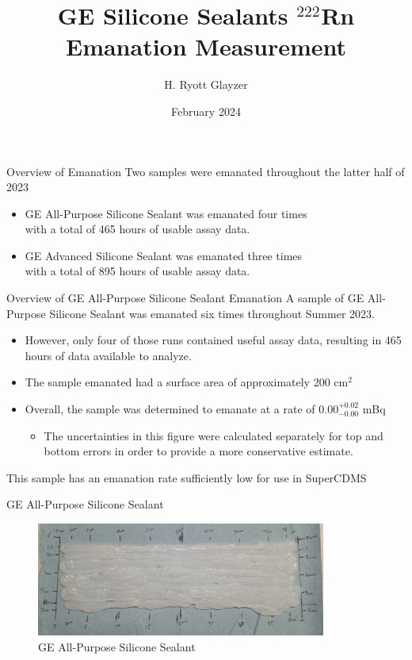\documentclass[aspectratio=169]{beamer}
\title{GE Silicone Sealants $^{222}$Rn Emanation Measurement}
\author[H. R. Glayzer]{H. Ryott Glayzer}
\institute[SDSMT]
{Lab Assistant\\
    SD Mines}
\date[2024]{February 2024}
\begin{document}
\frame{\titlepage}

\begin{frame}{Overview of Emanation}
    Two samples were emanated throughout the latter half of 2023
    \begin{itemize}
        \item GE All-Purpose Silicone Sealant was emanated four times\\
            with a total of 465 hours of usable assay data.
        \item GE Advanced Silicone Sealant was emanated three times\\
            with a total of 895 hours of usable assay data.
    \end{itemize}
\end{frame}

\begin{frame}{Overview of GE All-Purpose Silicone Sealant Emanation}
    A sample of GE All-Purpose Silicone Sealant was emanated six times throughout Summer 2023.
        \begin{itemize}
            \item However, only four of those runs contained useful assay data,\@
                resulting in 465 hours of data available to analyze.
            \item The sample emanated had a surface area of approximately 200 cm$^{2}$
            \item Overall, the sample was determined to emanate at a rate of 0.00$^{+0.02}_{-0.00}$ mBq
            \begin{itemize}
                \item The uncertainties in this figure were calculated separately for top\@
                    and bottom errors in order to provide a more conservative estimate.
            \end{itemize}
        \end{itemize}
    This sample has an emanation rate sufficiently low for use in SuperCDMS
\end{frame}

\begin{frame}{GE All-Purpose Silicone Sealant}
    \begin{figure}
         \centering
        \includegraphics[width=0.85\textwidth]{assets/all-purpose-sample.png}
        \caption{GE All-Purpose Silicone Sealant}
    \end{figure}
\end{frame}
\end{document}
